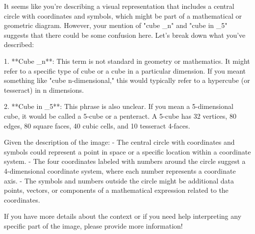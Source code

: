 It seems like you're describing a visual representation that includes a central circle with coordinates and symbols, which might be part of a mathematical or geometric diagram. However, your mention of "cube _n" and "cube in _5" suggests that there could be some confusion here. Let's break down what you've described:

1. **Cube _n**: This term is not standard in geometry or mathematics. It might refer to a specific type of cube or a cube in a particular dimension. If you meant something like "cube n-dimensional," this would typically refer to a hypercube (or tesseract) in n dimensions.

2. **Cube in _5**: This phrase is also unclear. If you mean a 5-dimensional cube, it would be called a 5-cube or a penteract. A 5-cube has 32 vertices, 80 edges, 80 square faces, 40 cubic cells, and 10 tesseract 4-faces.

Given the description of the image:
- The central circle with coordinates and symbols could represent a point in space or a specific location within a coordinate system.
- The four coordinates labeled with numbers around the circle suggest a 4-dimensional coordinate system, where each number represents a coordinate axis.
- The symbols and numbers outside the circle might be additional data points, vectors, or components of a mathematical expression related to the coordinates.

If you have more details about the context or if you need help interpreting any specific part of the image, please provide more information!